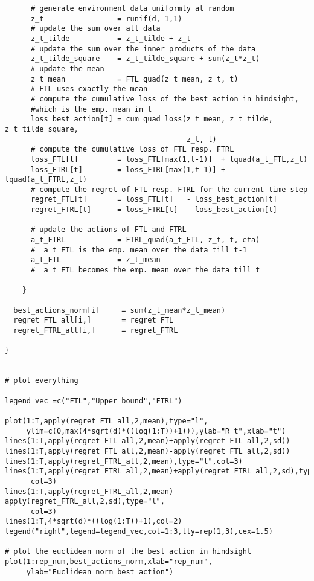 \documentclass[a4paper]{article}
\begin{document}
{\begin{lstlisting}
      # generate environment data uniformly at random
      z_t                 = runif(d,-1,1)
      # update the sum over all data
      z_t_tilde           = z_t_tilde + z_t
      # update the sum over the inner products of the data
      z_t_tilde_square    = z_t_tilde_square + sum(z_t*z_t)
      # update the mean
      z_t_mean            = FTL_quad(z_t_mean, z_t, t) 
      # FTL uses exactly the mean
      # compute the cumulative loss of the best action in hindsight, 
      #which is the emp. mean in t
      loss_best_action[t] = cum_quad_loss(z_t_mean, z_t_tilde, z_t_tilde_square,
                                          z_t, t)
      # compute the cumulative loss of FTL resp. FTRL
      loss_FTL[t]         = loss_FTL[max(1,t-1)]  + lquad(a_t_FTL,z_t)  
      loss_FTRL[t]        = loss_FTRL[max(1,t-1)] + lquad(a_t_FTRL,z_t)
      # compute the regret of FTL resp. FTRL for the current time step
      regret_FTL[t]       = loss_FTL[t]   - loss_best_action[t]
      regret_FTRL[t]      = loss_FTRL[t]  - loss_best_action[t]
      
      # update the actions of FTL and FTRL        
      a_t_FTRL            = FTRL_quad(a_t_FTL, z_t, t, eta) 
      #  a_t_FTL is the emp. mean over the data till t-1
      a_t_FTL             = z_t_mean 
      #  a_t_FTL becomes the emp. mean over the data till t
      
    }
  
  best_actions_norm[i]     = sum(z_t_mean*z_t_mean)
  regret_FTL_all[i,]       = regret_FTL
  regret_FTRL_all[i,]      = regret_FTRL

}


# plot everything 

legend_vec =c("FTL","Upper bound","FTRL")

plot(1:T,apply(regret_FTL_all,2,mean),type="l",
     ylim=c(0,max(4*sqrt(d)*((log(1:T))+1))),ylab="R_t",xlab="t")
lines(1:T,apply(regret_FTL_all,2,mean)+apply(regret_FTL_all,2,sd))
lines(1:T,apply(regret_FTL_all,2,mean)-apply(regret_FTL_all,2,sd))
lines(1:T,apply(regret_FTRL_all,2,mean),type="l",col=3)
lines(1:T,apply(regret_FTRL_all,2,mean)+apply(regret_FTRL_all,2,sd),type="l",
      col=3)
lines(1:T,apply(regret_FTRL_all,2,mean)-apply(regret_FTRL_all,2,sd),type="l",
      col=3)
lines(1:T,4*sqrt(d)*((log(1:T))+1),col=2)
legend("right",legend=legend_vec,col=1:3,lty=rep(1,3),cex=1.5)

# plot the euclidean norm of the best action in hindsight
plot(1:rep_num,best_actions_norm,xlab="rep_num",
     ylab="Euclidean norm best action")


\end{lstlisting}}
\end{document}
